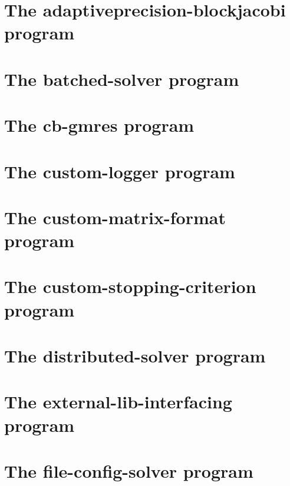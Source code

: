 \let\mypdfximage\pdfximage\def\pdfximage{\immediate\mypdfximage}\documentclass[twoside]{book}
\newcommand{\+}{\discretionary{\mbox{\scriptsize$\hookleftarrow$}}{}{}}
\begin{document}
\chapter{The adaptiveprecision-\/blockjacobi program}
\label{adaptiveprecision_blockjacobi}

\chapter{The batched-\/solver program}
\label{batched_solver}

\chapter{The cb-\/gmres program}
\label{cb_gmres}

\chapter{The custom-\/logger program}
\label{custom_logger}

\chapter{The custom-\/matrix-\/format program}
\label{custom_matrix_format}

\chapter{The custom-\/stopping-\/criterion program}
\label{custom_stopping_criterion}

\chapter{The distributed-\/solver program}
\label{distributed_solver}

\chapter{The external-\/lib-\/interfacing program}
\label{external_lib_interfacing}

\chapter{The file-\/config-\/solver program}
\label{file_config_solver}

\end{document}
